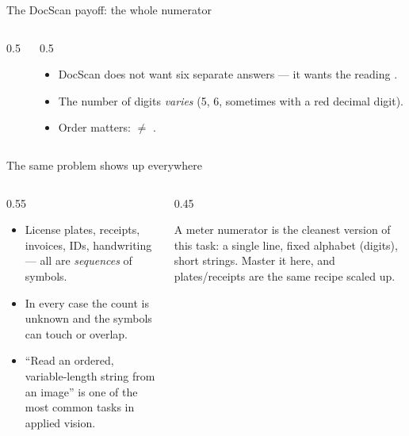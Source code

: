 \documentclass[10pt,aspectratio=169]{beamer}
\begin{document}
\begin{frame}{The DocScan payoff: the whole numerator}
  \begin{columns}[T]
    \begin{column}{0.5\textwidth}
      \begin{center}
      \end{center}
    \end{column}
    \begin{column}{0.5\textwidth}
      \begin{itemize}
        \item DocScan does not want six separate answers --- it wants the reading .
        \item The number of digits \emph{varies} (5, 6, sometimes with a red decimal digit).
        \item Order matters:  $\neq$ .
      \end{itemize}
    \end{column}
  \end{columns}
\end{frame}

\begin{frame}{The same problem shows up everywhere}
  \begin{columns}[T]
    \begin{column}{0.55\textwidth}
      \begin{itemize}
        \item License plates, receipts, invoices, IDs, handwriting --- all are \emph{sequences} of symbols.
        \item In every case the count is unknown and the symbols can touch or overlap.
        \item ``Read an ordered, variable-length string from an image'' is one of the most common tasks in applied vision.
      \end{itemize}
    \end{column}
    \begin{column}{0.45\textwidth}
      \begin{infobox}
        A meter numerator is the cleanest version of this task: a single line, fixed alphabet
        (digits), short strings. Master it here, and plates/receipts are the same recipe scaled up.
      \end{infobox}
    \end{column}
  \end{columns}
\end{frame}
\end{document}
